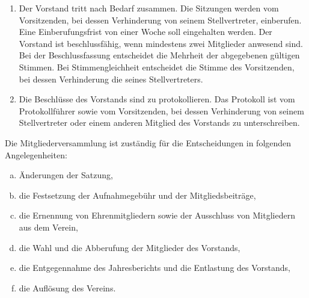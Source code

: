 \documentclass{scrartcl}
\begin{document}
\begin{contract}
\Clause[title={Beratung und Beschlussfassung des Vorstands}]
\begin{enumerate}
    \item Der Vorstand tritt nach Bedarf zusammen. Die Sitzungen werden vom Vorsitzenden, bei dessen Verhinderung von seinem Stellvertreter, einberufen. Eine Einberufungsfrist von einer Woche soll eingehalten werden. Der Vorstand ist beschlussfähig, wenn mindestens zwei Mitglieder anwesend sind. Bei der Beschlussfassung entscheidet die Mehrheit der abgegebenen gültigen Stimmen. Bei Stimmengleichheit entscheidet die Stimme des Vorsitzenden, bei dessen Verhinderung die seines Stellvertreters.
    \item Die Beschlüsse des Vorstands sind zu protokollieren. Das Protokoll ist vom Protokollführer sowie vom Vorsitzenden, bei dessen Verhinderung von seinem Stellvertreter oder einem anderen Mitglied des Vorstands zu unterschreiben.
\end{enumerate}

\Clause[title={Aufgaben der Mitgliederversammlung}]
Die Mitgliederversammlung ist zuständig für die Entscheidungen in folgenden
Angelegenheiten: 
\begin{enumerate}[(a)]
    \item Änderungen der Satzung,
    \item die Festsetzung der Aufnahmegebühr und der Mitgliedsbeiträge,
    \item die Ernennung von Ehrenmitgliedern sowie der Ausschluss von Mitgliedern aus dem Verein, 
    \item die Wahl und die Abberufung der Mitglieder des Vorstands,
    \item die Entgegennahme des Jahresberichts und die Entlastung des Vorstands,
    \item die Auflösung des Vereins.
\end{enumerate}


\end{contract}
\end{document}
